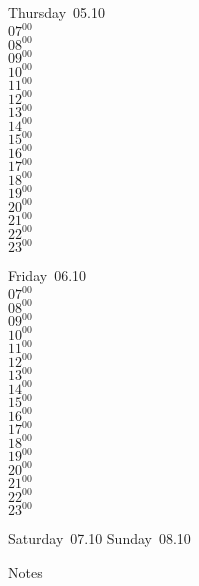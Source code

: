 \documentclass[11pt, a4paper]{book}\usepackage[]{graphicx}\usepackage[]{color}
\begin{document}
\begin{weekdaybox}
  Thursday~05.10\\
  { 
  \vfill
  $07^{00}$\\
$08^{00}$\\
$09^{00}$\\
$10^{00}$\\
$11^{00}$\\
$12^{00}$\\
$13^{00}$\\
$14^{00}$\\
$15^{00}$\\
$16^{00}$\\
$17^{00}$\\
$18^{00}$\\
$19^{00}$\\
$20^{00}$\\
$21^{00}$\\
$22^{00}$\\
$23^{00}$\\
  }
\end{weekdaybox} 
\begin{weekdaybox}
  Friday~06.10\\
  { 
  \vfill
  $07^{00}$\\
$08^{00}$\\
$09^{00}$\\
$10^{00}$\\
$11^{00}$\\
$12^{00}$\\
$13^{00}$\\
$14^{00}$\\
$15^{00}$\\
$16^{00}$\\
$17^{00}$\\
$18^{00}$\\
$19^{00}$\\
$20^{00}$\\
$21^{00}$\\
$22^{00}$\\
$23^{00}$\\
  }
\end{weekdaybox}
\begin{weekendbox}
  Saturday~07.10
  \tcblower
  Sunday~08.10
\end{weekendbox} %
\begin{notebox}
  Notes
\end{notebox}
\clearpage
\end{document}
